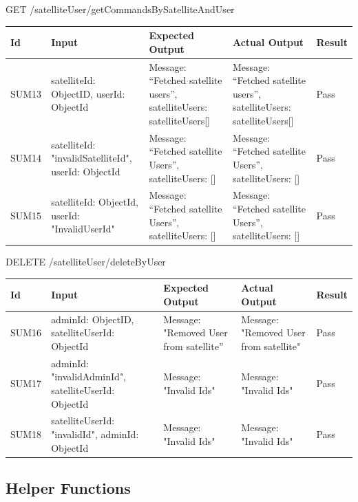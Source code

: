 \documentclass[12pt, titlepage]{article}
\begin{document}
GET /satelliteUser/getCommandsBySatelliteAndUser

\begin{center}
\begin{tabular}{|p{1.5cm} | p{3cm} |p{2cm}| p{2cm} |p{2cm}|}
\hline
\textbf{Id} & \textbf{Input} & \textbf{Expected Output} & \textbf{Actual Output} & \textbf{Result} \\
\hline
SUM13 &   { satelliteId: ObjectID, userId: ObjectId } & { Message: “Fetched satellite users”,
satelliteUsers: satelliteUsers[] } & { Message: “Fetched satellite users”,
satelliteUsers: satelliteUsers[] } & Pass
\\
\hline
SUM14 &   { satelliteId: "invalidSatelliteId", userId: ObjectId} & { Message: “Fetched satellite Users”,
satelliteUsers: [] } & { Message: “Fetched satellite Users”,
satelliteUsers: [] } & Pass
\\
\hline
SUM15 &   { satelliteId: ObjectId, userId: "InvalidUserId"} & { Message: “Fetched satellite Users”,
satelliteUsers: [] } & { Message: “Fetched satellite Users”,
satelliteUsers: [] } & Pass
\\
\hline

\end{tabular}

\end{center}

DELETE /satelliteUser/deleteByUser

\begin{center}
\begin{tabular}{|p{1.5cm} | p{3cm} |p{2cm}| p{2cm} |p{2cm}|}
\hline
\textbf{Id}  & \textbf{Input} & \textbf{Expected Output} & \textbf{Actual Output} & \textbf{Result} \\
\hline
SUM16 &  { adminId: ObjectID, satelliteUserId: ObjectId } & { Message: "Removed User from satellite”} & { Message: "Removed User from satellite"} & Pass
\\
\hline
SUM17 & { adminId: "invalidAdminId", satelliteUserId: ObjectId} & { Message: "Invalid Ids"} & { Message: "Invalid Ids" } & Pass
\\
\hline
SUM18 & { satelliteUserId: "invalidId", adminId: ObjectId} & { Message: "Invalid Ids"} & { Message: "Invalid Ids" } & Pass
\\
\hline

\end{tabular}

\end{center}

\subsection{Helper Functions}
\end{document}

